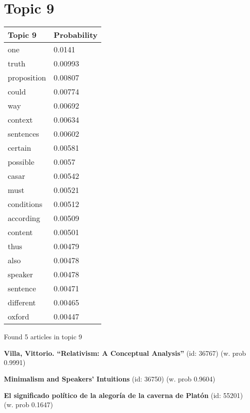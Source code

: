 \documentclass{article}
\begin{document}
\vfill
\newpage


\centering
\thispagestyle{empty}
\section*{Topic 9}\vfill
\begin{tabular}{ll}
\toprule
     Topic 9 & Probability \\
\midrule
         one &      0.0141 \\
       truth &     0.00993 \\
 proposition &     0.00807 \\
       could &     0.00774 \\
         way &     0.00692 \\
     context &     0.00634 \\
   sentences &     0.00602 \\
     certain &     0.00581 \\
    possible &      0.0057 \\
       casar &     0.00542 \\
        must &     0.00521 \\
  conditions &     0.00512 \\
   according &     0.00509 \\
     content &     0.00501 \\
        thus &     0.00479 \\
        also &     0.00478 \\
     speaker &     0.00478 \\
    sentence &     0.00471 \\
   different &     0.00465 \\
      oxford &     0.00447 \\
\bottomrule
\end{tabular}

\vfill
Found 5 articles in topic 9
\vfill

\textbf{Villa, Vittorio. “Relativism: A Conceptual Analysis”} (id: 36767)
 (w. prob 0.9991)
\vfill

\textbf{Minimalism and Speakers’ Intuitions} (id: 36750)
 (w. prob 0.9604)
\vfill

\textbf{El significado político de la alegoría de la caverna de Platón} (id: 55201)
 (w. prob 0.1647)

\vfill
\newpage


\centering
\thispagestyle{empty}
\end{document}
